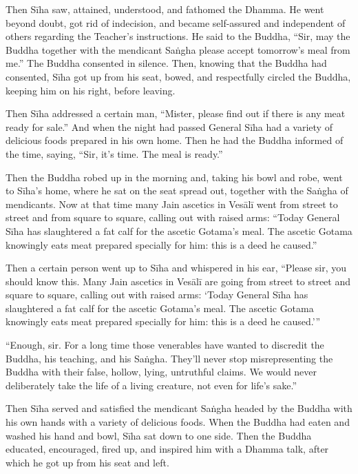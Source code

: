 \documentclass[12pt,openany]{book}%
\begin{document}
Then \textsanskrit{Sīha} saw, attained, understood, and fathomed the Dhamma. He went beyond doubt, got rid of indecision, and became self-assured and independent of others regarding the Teacher’s instructions. He said to the Buddha, “Sir, may the Buddha together with the mendicant \textsanskrit{Saṅgha} please accept tomorrow’s meal from me.” The Buddha consented in silence. Then, knowing that the Buddha had consented, \textsanskrit{Sīha} got up from his seat, bowed, and respectfully circled the Buddha, keeping him on his right, before leaving. 

Then \textsanskrit{Sīha} addressed a certain man, “Mister, please find out if there is any meat ready for sale.” And when the night had passed General \textsanskrit{Sīha} had a variety of delicious foods prepared in his own home. Then he had the Buddha informed of the time, saying, “Sir, it’s time. The meal is ready.” 

Then the Buddha robed up in the morning and, taking his bowl and robe, went to \textsanskrit{Sīha}’s home, where he sat on the seat spread out, together with the \textsanskrit{Saṅgha} of mendicants. Now at that time many Jain ascetics in \textsanskrit{Vesālī} went from street to street and from square to square, calling out with raised arms: “Today General \textsanskrit{Sīha} has slaughtered a fat calf for the ascetic Gotama’s meal. The ascetic Gotama knowingly eats meat prepared specially for him: this is a deed he caused.” 

Then a certain person went up to \textsanskrit{Sīha} and whispered in his ear, “Please sir, you should know this. Many Jain ascetics in \textsanskrit{Vesālī} are going from street to street and square to square, calling out with raised arms: ‘Today General \textsanskrit{Sīha} has slaughtered a fat calf for the ascetic Gotama’s meal. The ascetic Gotama knowingly eats meat prepared specially for him: this is a deed he caused.’” 

“Enough, sir. For a long time those venerables have wanted to discredit the Buddha, his teaching, and his \textsanskrit{Saṅgha}. They’ll never stop misrepresenting the Buddha with their false, hollow, lying, untruthful claims. We would never deliberately take the life of a living creature, not even for life’s sake.” 

Then \textsanskrit{Sīha} served and satisfied the mendicant \textsanskrit{Saṅgha} headed by the Buddha with his own hands with a variety of delicious foods. When the Buddha had eaten and washed his hand and bowl, \textsanskrit{Sīha} sat down to one side. Then the Buddha educated, encouraged, fired up, and inspired him with a Dhamma talk, after which he got up from his seat and left. 
\end{document}
